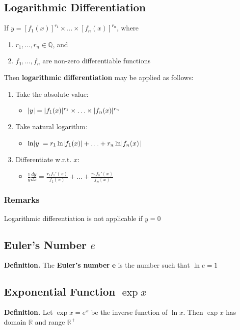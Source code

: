 \documentclass[../ma2002_notes.tex]{subfiles}
\begin{document}
\subsection{Logarithmic Differentiation}
If \(y=[f_1(x)]^{r_1}\times\ldots\times[f_n(x)]^{r_n}\), where
\begin{enumerate}
	\item\(r_1,\ldots,r_n\in\mathbb{Q}\), and
	\item\(f_1,\ldots,f_n\) are non-zero differentiable functions
\end{enumerate}
Then \textbf{logarithmic differentiation} may be applied as follows:
\begin{enumerate}
	\item Take the absolute value:
	\begin{itemize}
		\item\(\lvert y\rvert=\lvert f_1(x)\rvert^{r_1}\times\ldots\times\lvert f_n(x)\rvert^{r_n}\)
	\end{itemize}
	\item Take natural logarithm:
	\begin{itemize}
		\item\(\ln\lvert y\rvert=r_1\ln\lvert f_1(x)\rvert+\ldots+r_n\ln\lvert f_n(x)\rvert\)
	\end{itemize}
	\item Differentiate w.r.t. \(x\):
	\begin{itemize}
		\item\(\displaystyle\frac{1}{y}\frac{dy}{dx}=\frac{r_1f_1'(x)}{f_1(x)}+\ldots+\frac{r_nf_n'(x)}{f_n(x)}\)
	\end{itemize}
\end{enumerate}

\subsubsection{Remarks}
Logarithmic differentiation is not applicable if \(y=0\)

\subsection{Euler's Number $e$}
\textbf{Definition.} The \textbf{Euler's number} \(\pmb{e}\) is the number such that \(\ln e=1\)

\subsection{Exponential Function $\exp x$}
\textbf{Definition.} Let \(\exp x=e^x\) be the inverse function of \(\ln x\). Then \(\exp x\) has domain \(\mathbb{R}\) and range \(\mathbb{R}^+\)
\end{document}
